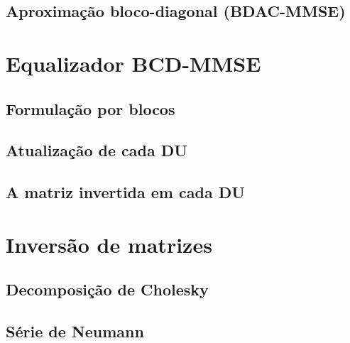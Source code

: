 

\subsection{Aproximação bloco-diagonal (BDAC-MMSE)}

\section{Equalizador BCD-MMSE}\label{sec:bcd}

\subsection{Formulação por blocos}

\subsection{Atualização de cada DU}

\subsection{A matriz invertida em cada DU}\label{subsec:Gc}

\section{Inversão de matrizes}

\subsection{Decomposição de Cholesky}

\subsection{Série de Neumann}

